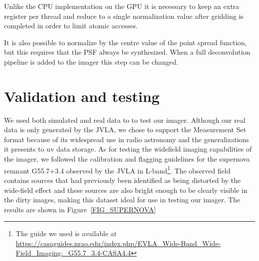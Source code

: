 Unlike the CPU implementation on the GPU it is necessary to keep an extra register per thread and reduce to a single normalization value after gridding is completed in order to limit atomic accesses.

It is also possible to normalize by the centre value of the point spread function, but this requires that the PSF always be synthesized. When a full deconvolution pipeline is added to the imager this step
can be changed.

\section{Validation and testing}
We used both simulated and real data to to test our imager. Although our real data is only generated
by the JVLA, we chose to support the Measurement Set format because of its widespread use in radio astronomy and the generalizations it presents to
uv data storage.  As for testing the  widefield imaging capabilities of the imager, we followed the calibration and flagging guidelines for the supernova 
remnant G55.7+3.4 observed by the JVLA in L-band\footnote{The guide we used is available at \url{https://casaguides.nrao.edu/index.php/EVLA_Wide-Band_Wide-Field_Imaging:_G55.7_3.4-CASA4.4}}.
The observed field contains sources that had previously been identified as being distorted by the wide-field effect and these sources are also bright enough to be clearly visible in 
the dirty images, making this dataset ideal for use in testing our imager. The results are shown in Figure~\ref{FIG_SUPERNOVA}


